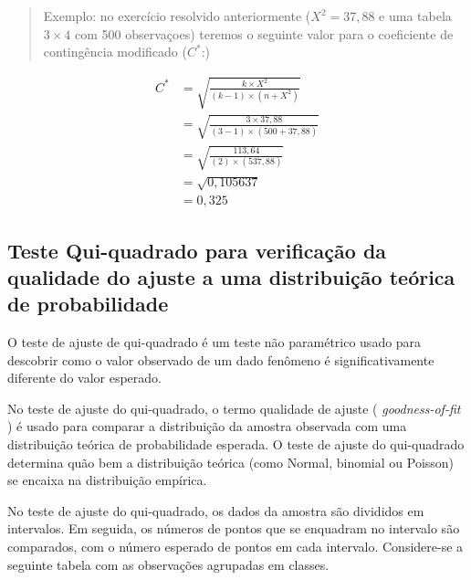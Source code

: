 \documentclass[
]{book}
\begin{document}
\hfill\break

\begin{quote}
Exemplo: no exercício resolvido anteriormente (\(X^{2}=37,88\) e uma tabela \(3 \times 4\) com 500 observaçoes) teremos o seguinte valor para o coeficiente de contingência modificado (\(C^{*}\):)
\end{quote}

\hfill\break

\begin{align*}
C^{*} & =  \sqrt{ \frac{k \times X^{2}}{(k-1)\times (n + X^{2}) } }\\   
 & =  \sqrt{ \frac{3 \times 37,88}{(3-1)\times (500 + 37,88) } }\\
 & =  \sqrt{ \frac{113,64}{(2)\times (537,88) } }\\
 & =  \sqrt{0,105637}\\
 & =  0,325
\end{align*}

\hfill\break

\hypertarget{teste-qui-quadrado-para-verificauxe7uxe3o-da-qualidade-do-ajuste-a-uma-distribuiuxe7uxe3o-teuxf3rica-de-probabilidade}{%
\subsection{Teste Qui-quadrado para verificação da qualidade do ajuste a uma distribuição teórica de probabilidade}\label{teste-qui-quadrado-para-verificauxe7uxe3o-da-qualidade-do-ajuste-a-uma-distribuiuxe7uxe3o-teuxf3rica-de-probabilidade}}

\hfill\break

O teste de ajuste de qui-quadrado é um teste não paramétrico usado para descobrir como o valor observado de um dado fenômeno é significativamente diferente do valor esperado.

\hfill\break

No teste de ajuste do qui-quadrado, o termo qualidade de ajuste ( \emph{goodness-of-fit} ) é usado para comparar a distribuição da amostra observada com uma distribuição teórica de probabilidade esperada. O teste de ajuste do qui-quadrado determina quão bem a distribuição teórica (como Normal, binomial ou Poisson) se encaixa na distribuição empírica.

\hfill\break

No teste de ajuste do qui-quadrado, os dados da amostra são divididos em intervalos. Em seguida, os números de pontos que se enquadram no intervalo são comparados, com o número esperado de pontos em cada intervalo. Considere-se a seguinte tabela com as observações agrupadas em classes.
\end{document}
